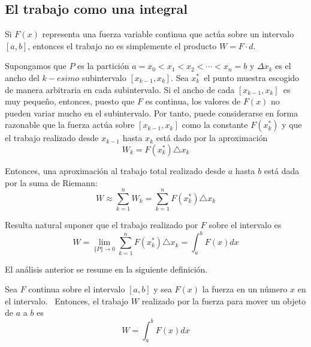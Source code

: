 \subsection*{El trabajo como una integral} 

Si $F(x)$ representa una fuerza
variable continua que actúa sobre un intervalo $[a,b]$, entonces el
trabajo no es simplemente el producto $W=F\cdot d$.

Supongamos que $P$ es la partición $a=x_{0}<x_{1}<x_{2}<\cdots <x_{n}=b$ y $%
\Delta x_{k}$ es el ancho del $k-{e}simo$ subintervalo $%
[x_{k-1},x_{k}]$. Sea $x_{k}^{\ast }$\ el punto muestra escogido de manera
arbitraria en cada subintervalo. Si el ancho de cada $[x_{k-1},x_{k}]$\ es
muy pequeño, entonces, puesto que $F$ es continua, los valores
de $F(x)$ no pueden variar mucho en el subintervalo. Por tanto, puede considerarse en forma razonable que la fuerza actúa sobre $[x_{k-1},x_{k}]$ como la constante $F\left( x_{k}^{\ast }\right) $ y
que el trabajo realizado desde $x_{k-1}$ hasta $x_{k}$ está dado por la
aproximación
\[
W_{k}=F\left( x_{k}^{\ast }\right) \triangle x_{k}
\]

Entonces, una aproximación al trabajo total realizado desde $a$ hasta $b$
está dada por la suma de Riemann:
\[
W\approx \sum_{k=1}^{n}W_{k}=\sum_{k=1}^{n}F\left( x_{k}^{\ast }\right)
\triangle x_{k}
\]

Resulta natural suponer que el trabajo realizado por $F$ sobre el intervalo
es
\[
W=\lim_{\left\Vert P\right\Vert \rightarrow 0}\sum_{k=1}^{n}F\left(
x_{k}^{\ast }\right) \triangle x_{k}=\int_{a}^{b}F\left( x\right) dx
\]

El análisis anterior se resume en la siguiente definición.

\begin{defi}
\textnormal{Sea \textit{$F$} continua sobre el intervalo \textit{$[a,b]$} y sea \textit{$F(x)$} la fuerza en un número \textit{$x$} en el intervalo. \ Entonces, el trabajo \textit{$W$} realizado por la fuerza para mover un objeto de \textit{$a$} a \textit{$b$} es}
\begin{equation}\label{trabajo}
W=\int_{a}^{b}F\left( x\right) dx
\end{equation}
\end{defi}




